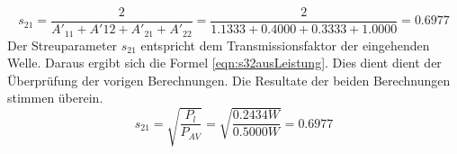 \begin{equation}\label{eqn:s21ausA}
	s_{21} = \frac{2}{A'_{11}+A'{12}+A'_{21}+A'_{22}}
	=
	\frac{2}{1.1333+0.4000+0.3333+1.0000}
	= 0.6977
\end{equation}
Der Streuparameter $s_{21}$ entspricht dem Transmissionsfaktor der eingehenden Welle. Daraus ergibt sich die Formel \ref{eqn:s32ausLeistung}. Dies dient dient der Überprüfung der vorigen Berechnungen. Die Resultate der beiden Berechnungen stimmen überein.
\begin{equation} \label{eqn:s32ausLeistung}
	s_{21} = \sqrt{ \frac {P_l}{P_{AV}}} = \sqrt{ \frac{0.2434W} {0.5000W}} = 0.6977
\end{equation}
